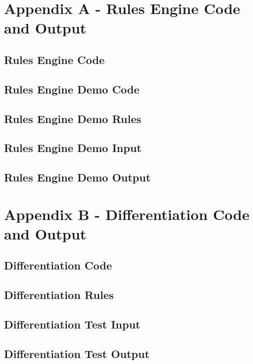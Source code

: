 \documentclass[letterpaper]{article}
\begin{document}
\newpage
\section{Appendix A - Rules Engine Code and Output}
\subsection{Rules Engine Code}

\subsection{Rules Engine Demo Code}

\subsection{Rules Engine Demo Rules}

\subsection{Rules Engine Demo Input}

\subsection{Rules Engine Demo Output}



\newpage
\section{Appendix B - Differentiation Code and Output}
\subsection{Differentiation Code}

\subsection{Differentiation Rules}

\subsection{Differentiation Test Input}

\subsection{Differentiation Test Output}

\end{document}
